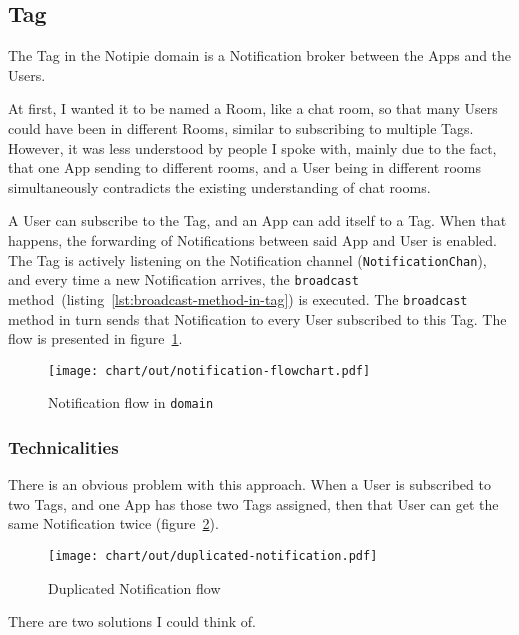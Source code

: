 \subsection{Tag}\label{sec:tag}

The Tag in the Notipie domain
is a Notification broker
between the Apps and the Users.

At first,
I wanted it to be named a Room,
like a chat room,
so that many Users could have been
in different Rooms,
similar to subscribing to multiple Tags.
However,
it was less understood by people I spoke with,
mainly due to the fact,
that one App sending to different rooms,
and a User being in different rooms simultaneously
contradicts the existing understanding of chat rooms.

A User can subscribe to the Tag,
and an App can add itself to a Tag.
When that happens,
the forwarding of Notifications
between said App and User is enabled.
The Tag is actively listening
on the Notification channel (\texttt{NotificationChan}),
and every time a new Notification arrives,
the \texttt{broadcast} method~(listing~\ref{lst:broadcast-method-in-tag})
is executed.
The \texttt{broadcast} method in turn sends that Notification
to every User subscribed to this Tag.
The flow is presented in figure~\ref{fig:notification-flowchart}.

\begin{figure}[h]
  \centering
  \texttt{[image: chart/out/notification-flowchart.pdf]}
  \caption{Notification flow in \texttt{domain}}
  \label{fig:notification-flowchart}
\end{figure}

\subsubsection{Technicalities}\label{sec:tag-technicalities}

There is an obvious problem with this approach.
When a User is subscribed to two Tags,
and one App has those two Tags assigned,
then that User can get the same Notification twice
(figure~\ref{fig:duplicated-notification}).

\begin{figure}[h]
  \centering
  \texttt{[image: chart/out/duplicated-notification.pdf]}
  \caption{Duplicated Notification flow}
  \label{fig:duplicated-notification}
\end{figure}

There are two solutions I could think of.

